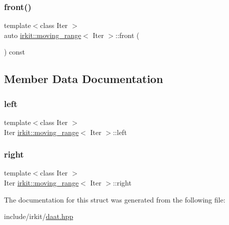 \mbox{\label{structirkit_1_1moving__range_ad9b6b752c32f19fdbfe2dfa607ea4fc3}} 
\subsubsection{\texorpdfstring{front()}{front()}}
{\footnotesize\ttfamily template$<$class Iter $>$ \\
auto \mbox{\hyperlink{structirkit_1_1moving__range}{irkit\+::moving\+\_\+range}}$<$ Iter $>$\+::front (\begin{DoxyParamCaption}{ }\end{DoxyParamCaption}) const\hspace{0.3cm}{\ttfamily [inline]}}



\subsection{Member Data Documentation}
\mbox{\label{structirkit_1_1moving__range_a175a0bc6996715ea27e6b87abff03139}} 
\subsubsection{\texorpdfstring{left}{left}}
{\footnotesize\ttfamily template$<$class Iter $>$ \\
Iter \mbox{\hyperlink{structirkit_1_1moving__range}{irkit\+::moving\+\_\+range}}$<$ Iter $>$\+::left}

\mbox{\label{structirkit_1_1moving__range_aa64b16b98bdd7b627ecceb82c8ef3bec}} 
\subsubsection{\texorpdfstring{right}{right}}
{\footnotesize\ttfamily template$<$class Iter $>$ \\
Iter \mbox{\hyperlink{structirkit_1_1moving__range}{irkit\+::moving\+\_\+range}}$<$ Iter $>$\+::right}



The documentation for this struct was generated from the following file\+:\begin{DoxyCompactItemize}
\item 
include/irkit/\mbox{\hyperlink{daat_8hpp}{daat.\+hpp}}\end{DoxyCompactItemize}
